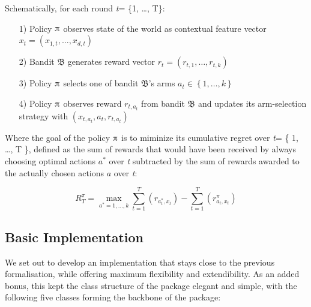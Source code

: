 \documentclass[nojss]{jss}\usepackage[]{graphicx}\usepackage[]{color}
\begin{document}
Schematically, for each round \emph{t}= \{1, \ldots, T\}:

\begin{enumerate}
         \item[1)] Policy $\piup$ observes state of the world as contextual feature vector \(x_{t}=\left( x_{1,t},  \dots, x_{d,t}\right)\)
         \item[2)] Bandit $\mathfrak{B}$ generates reward vector \(r_{t}=\left( r_{t,1},  \dots, r_{t,k}\right)\)
         \item[3)] Policy $\piup$ selects one of bandit $\mathfrak{B}$'s arms \(a_{t} \in \left\{ 1, \dots, k \right\}\)
         \item[4)] Policy $\piup$ observes reward \(r_{t,a_t}\) from bandit $\mathfrak{B}$ and updates its arm-selection strategy with \( (x_{t,a_t},a_{t},r_{t,a_t}) \)
\end{enumerate}

Where the goal of the policy $\piup$ is to miminize its cumulative regret over \emph{t}= \{ 1, \ldots, T \}, defined as the sum of rewards that would have been received by always choosing optimal actions $a^{*}$ over \emph{t} subtracted by the sum of rewards awarded to the actually chosen actions $a$ over \emph{t}:

\begin{equation} \label{eq:1}
R^{\pi}_{T} = \max_{a^{*}= 1, \dots, k} \sum^{T}_{t=1}(r_{a^{*}_t,x_t}) - \sum^{T}_{t=1}(r^{\pi}_{a_t,x_t})
\end{equation}

\subsection{Basic Implementation}

We set out to develop an implementation that stays close to the previous formalisation, while offering maximum flexibility and extendibility. As an added bonus, this kept the class structure of the package elegant and simple, with the following five classes forming the backbone of the package:
\end{document}
